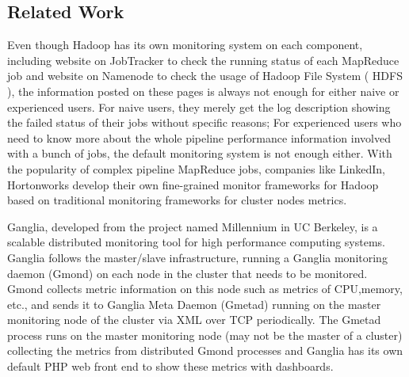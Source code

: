 \subsection{Related Work}
Even though Hadoop has its own monitoring system on each component, including website on JobTracker to check the running status of each MapReduce job and website on Namenode to check the usage of Hadoop File System ( HDFS ), the information posted on these pages is always not enough for either naive or experienced users.
For naive users, they merely get the log description showing the failed status of their jobs without specific reasons; For experienced users who need to know more about the whole pipeline performance information involved with a bunch of jobs, the default monitoring system is not enough either.
With the popularity of complex pipeline MapReduce jobs, companies like LinkedIn, Hortonworks develop their own fine-grained monitor frameworks for Hadoop based on traditional monitoring frameworks for cluster nodes metrics.\par
Ganglia\cite{massie2004ganglia}, developed from the project named Millennium in UC Berkeley, is a scalable distributed monitoring tool for high performance computing systems.
Ganglia follows the master/slave infrastructure, running a Ganglia monitoring daemon (Gmond) on each node in the cluster that needs to be monitored.
Gmond collects metric information on this node such as metrics of CPU,memory, etc., and sends it to Ganglia Meta Daemon (Gmetad) running on the master monitoring node of the cluster via XML over TCP periodically.
The Gmetad process runs on the master monitoring node (may not be the master of a cluster) collecting the metrics from distributed Gmond processes and Ganglia has its own default PHP web front end to show these metrics with dashboards.


